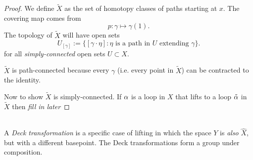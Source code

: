 \documentclass{amsart}
\begin{document}
	 \begin{proof}
	 	We define $\tilde{X}$ as the set of homotopy classes of paths starting at $x$. The covering map comes from
	 	$$
	 	p: \gamma \mapsto \gamma(1).
	 	$$
	 	The topology of $\tilde{X}$ will have open sets 
	 	$$
	 	U_{[\gamma]} := \{[\gamma \cdot \eta] : \eta \text{ is a path in $U$ extending $\gamma$}\}.
	 	$$
	 	for all \textit{simply-connected} open sets $U\subset X$.
	 	
	 	$\tilde{X}$ is path-connected because every $\gamma$ (i.e. every point in $\tilde{X}$) can be contracted to the identity.
	 	
	 	Now to show $\tilde{X}$ is simply-connected. If $\alpha$ is a loop in $X$ that lifts to a loop $\tilde{\alpha}$ in $\tilde{X}$ then \textit{fill in later}
	 \end{proof}\\
	 
	 A \textit{Deck transformation} is a specific case of lifting in which the space $Y$ is \textit{also} $\hat{X}$, but with a different basepoint. The Deck transformations form a group under composition.
	 
\end{document}

